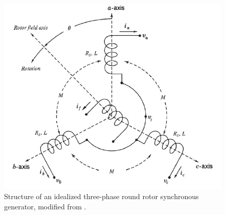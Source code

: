\documentclass[conference]{IEEEtran}
\begin{document}
\begin{figure}
\begin{centering}
\includegraphics[scale=0.5]{SGStucture}
\par\end{centering} \label{fig:structOfSG}

\caption[Structure of an idealized three-phase round rotor synchronous
generator]{Structure of an idealized three-phase round rotor
synchronous generator, modified from \cite[Figure 3.4]{GrSt2014}.}
\end{figure}
\end{document}
